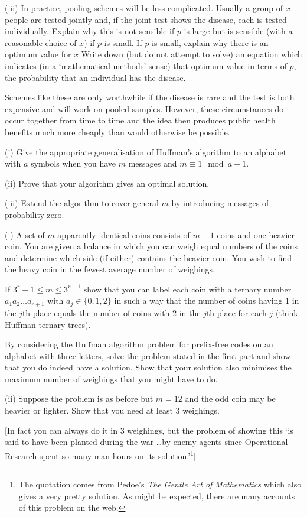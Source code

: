 \begin{question}
(iii) In practice, pooling schemes will be less complicated.
Usually a group of $x$ people are tested jointly
and, if the joint test shows the disease, each is tested individually.
Explain why this is not sensible if $p$ is large
but is sensible (with a reasonable choice of $x$)
if $p$ is small.
If $p$ is small, explain why there is an optimum value for $x$
Write down (but do not 
attempt to solve)
an equation which indicates (in a `mathematical methods' sense)
that optimum value
in terms of $p$, the probability that an individual has the
disease. 

Schemes like these are only worthwhile if the disease is rare and
the test is both expensive and will work on pooled samples.
However, these circumstances do occur together from
time to time and the idea then produces public health
benefits much more cheaply than would otherwise be possible.
\end{question}
\begin{question}\label{C1.12} 
(i) Give the appropriate generalisation
of Huffman's algorithm to an alphabet with $a$ symbols
when you have $m$ messages and $m\equiv 1\mod{a-1}$.

(ii) Prove that your algorithm gives an optimal
solution.

(iii) Extend the algorithm to cover general $m$ by 
introducing messages of probability zero.
\end{question}  
\begin{question}\label{C1.13} 
(i) A set of $m$ apparently identical 
coins consists of $m-1$ coins and one heavier coin.
You are given a balance in which you can weigh
equal numbers of the coins and determine which side
(if either) contains the heavier coin.
You wish to find the heavy coin in the fewest
average number of weighings. 

If $3^{r}+1\leq m\leq 3^{r+1}$ show that you can label
each coin with a ternary number $a_{1}a_{2}\ldots a_{r+1}$
with $a_{j}\in\{0,1,2\}$ in such a way that
the number of coins
having 
$1$ in the $j$th place
equals the number of coins with $2$ in the $j$th place
for each $j$
(think Huffman ternary trees).

By considering the Huffman algorithm problem for
prefix-free codes on an alphabet with
three letters, solve the problem stated in the first 
part and show that you do indeed
have a solution. Show that your
solution also minimises the maximum number
of weighings that you might have to do.

(ii) Suppose the problem is as before but
$m=12$ and the odd coin may be heavier or lighter.
Show that you need at least $3$ weighings.

[In fact you can always do it in $3$ weighings, but
the problem of showing this
`is said to have been planted
during the war \dots by enemy agents
since Operational Research spent so many man-hours
on its solution.'\footnote{The quotation comes
from Pedoe's \emph{The Gentle Art of Mathematics}
which also gives a very pretty solution.
As might be expected, there are many accounts of this problem
on the web.}]
\end{question}
